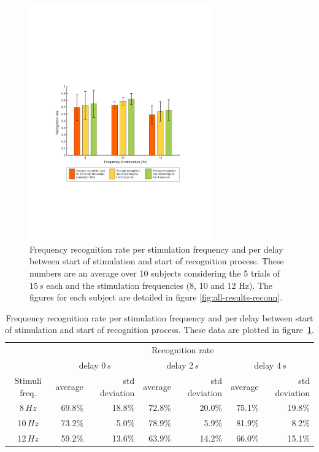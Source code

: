 \documentclass[smallextended]{svjour3}
\begin{document}
\begin{figure}
\center
\includegraphics[width=0.7\textwidth]{figures/taux-reconn.pdf}
\caption{Frequency recognition rate per stimulation frequency and per delay between start of stimulation and start of recognition process. These numbers are an average over 10 subjects considering the 5 trials of $15\,s$ each and the stimulation frequencies (8, 10 and 12 Hz). The figures for each subject are detailed in figure \ref{fig:all-results-reconn}.}
\label{fig:taux-reconn}
\end{figure}

\begin{table}\begin{center}
    \begin{tabular}{ c | r | r | r | r | r | r |}
        & \multicolumn{6}{c|}{Recognition rate} \\ 
        & \multicolumn{2}{c|}{delay 0\,$s$} & \multicolumn{2}{c|}{delay 2\,$s$} & \multicolumn{2}{c|}{delay 4\,$s$} \\ 
        Stimuli freq.& average & std deviation & average & std deviation & average & std deviation \\ \hline

         8\,$Hz$ & 69.8\% & 18.8\% & 72.8\% & 20.0\% & 75.1\% & 19.8\% \\
        10\,$Hz$ & 73.2\% &  5.0\% & 78.9\% & 5.9\% & 81.9\% & 8.2\% \\
        12\,$Hz$ & 59.2\% & 13.6\% & 63.9\% & 14.2\% & 66.0\% & 15.1\% \\ \hline
    \end{tabular}
    \caption{Frequency recognition rate per stimulation frequency and per delay between start of stimulation and start of recognition process. These data are plotted in figure~\ref{fig:taux-reconn}.}
\end{center}\end{table}
\end{document}
